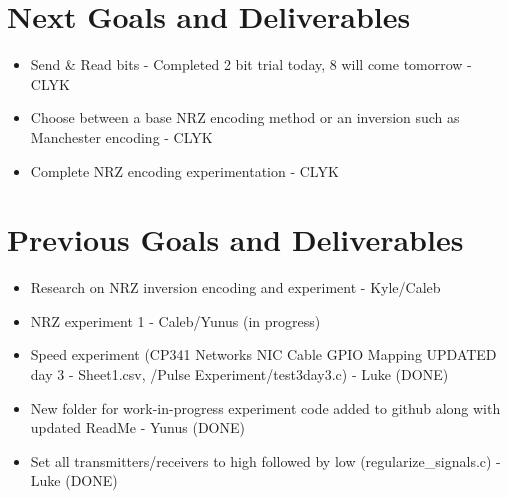 \documentclass{article}
\begin{document}
\section*{Next Goals and Deliverables}
\begin{itemize}
\item Send \& Read bits - Completed 2 bit trial today, 8 will come tomorrow - CLYK
\item Choose between a base NRZ encoding method or an inversion such as Manchester encoding - CLYK
\item Complete NRZ encoding experimentation - CLYK
\end{itemize}
\section*{Previous Goals and Deliverables}
\begin{itemize}
\item Research on NRZ inversion encoding and experiment - Kyle/Caleb
\item NRZ experiment 1 - Caleb/Yunus (in progress)
\item Speed experiment (CP341 Networks NIC Cable GPIO Mapping UPDATED day 3 - Sheet1.csv, /Pulse Experiment/test3day3.c) - Luke (DONE)
\item New folder for work-in-progress experiment code added to github along with updated ReadMe - Yunus (DONE)
\item Set all transmitters/receivers to high followed by low (regularize\_signals.c) - Luke (DONE)
\end{itemize}
\end{document}
